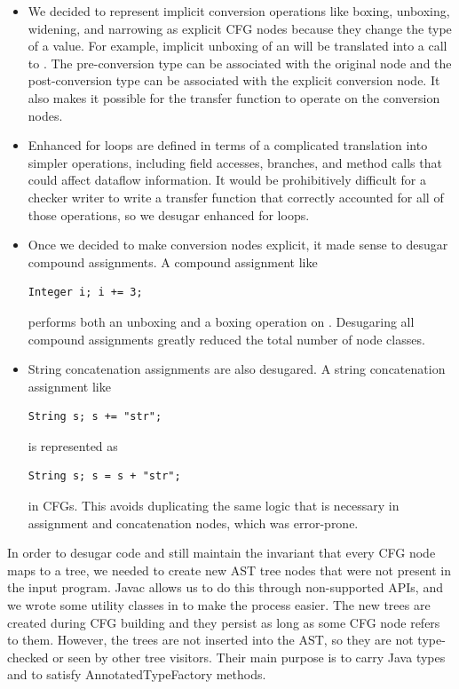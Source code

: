     \begin{itemize}
    \item We decided to represent implicit conversion operations like
      boxing, unboxing, widening, and narrowing as explicit CFG nodes
      because they change the type of a value.  For example, implicit
      unboxing of an  will be translated into a call to
      .  The pre-conversion type can be
      associated with the original node and the post-conversion type
      can be associated with the explicit conversion node.  It also
      makes it possible for the transfer function to operate on the
      conversion nodes.

    \item Enhanced for loops are defined in terms of a complicated
      translation into simpler operations, including field accesses,
      branches, and method calls that could affect dataflow
      information.  It would be prohibitively difficult for a checker
      writer to write a transfer function that correctly accounted for
      all of those operations, so we desugar enhanced for loops.

    \item Once we decided to make conversion nodes explicit, it made
      sense to desugar compound assignments.  A compound assignment
      like \begin{verbatim}Integer i; i += 3;\end{verbatim} performs
      both an unboxing and a boxing operation on .  Desugaring
      all compound assignments greatly reduced the total number of
      node classes.

    \item String concatenation assignments are also desugared. A string
      concatenation assignment like
      \begin{verbatim}String s; s += "str";\end{verbatim} is represented as
      \begin{verbatim}String s; s = s + "str";\end{verbatim} in CFGs.
      This avoids duplicating the same logic that is necessary in assignment
      and concatenation nodes, which was error-prone.

    \end{itemize}

In order to desugar code and still maintain the invariant that every
CFG node maps to a tree, we needed to create new AST tree nodes that
were not present in the input program.  Javac allows us to do this
through non-supported APIs, and we wrote some utility classes in
 to make the process easier.  The new trees are
created during CFG building and they persist as long as some CFG node
refers to them.  However, the trees are not inserted into the AST, so
they are not type-checked or seen by other tree visitors.  Their main
purpose is to carry Java types and to satisfy AnnotatedTypeFactory
methods.

